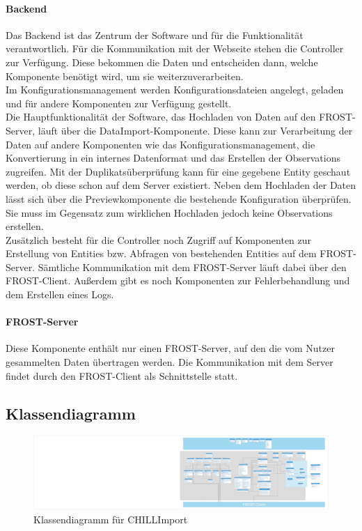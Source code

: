 \paragraph{Backend}
Das Backend ist das Zentrum der Software und für die Funktionalität verantwortlich.
Für die Kommunikation mit der Webseite stehen die Controller zur Verfügung.
Diese bekommen die Daten und entscheiden dann, welche Komponente benötigt wird, um sie weiterzuverarbeiten.\\

Im Konfigurationsmanagement werden Konfigurationsdateien angelegt, geladen und für andere Komponenten zur Verfügung gestellt.\\

Die Hauptfunktionalität der Software, das Hochladen von Daten auf den FROST-Server, läuft über die DataImport-Komponente.
Diese kann zur Verarbeitung der Daten auf andere Komponenten wie das Konfigurationsmanagement, die Konvertierung in ein internes Datenformat und das Erstellen der Observations zugreifen.
Mit der Duplikatsüberprüfung kann für eine gegebene Entity geschaut werden, ob diese schon auf dem Server existiert.
Neben dem Hochladen der Daten lässt sich über die Previewkomponente die bestehende Konfiguration überprüfen.
Sie muss im Gegensatz zum wirklichen Hochladen jedoch keine Observations erstellen.\\

Zusätzlich besteht für die Controller noch Zugriff auf Komponenten zur Erstellung von Entities bzw. Abfragen von bestehenden Entities auf dem FROST-Server.
Sämtliche Kommunikation mit dem FROST-Server läuft dabei über den FROST-Client.
Außerdem gibt es noch Komponenten zur Fehlerbehandlung und dem Erstellen eines Logs.

\paragraph{FROST-Server}
Diese Komponente enthält nur einen FROST-Server, auf den die vom Nutzer gesammelten Daten übertragen werden.
Die Kommunikation mit dem Server findet durch den FROST-Client als Schnittstelle statt.

\subsection{Klassendiagramm}

\begin{figure}[htbp]
\centering
\includegraphics[scale=0.15]{Klassendiagramm/klassendiagramm.eps}
\caption{Klassendiagramm für CHILLImport}
\end{figure}